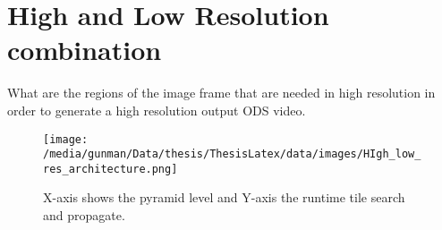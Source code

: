 \section{High and Low Resolution combination}
What are the regions of the image frame that are needed in high resolution in order to generate a high resolution output ODS video. 
\begin{figure*}
	\begin{center}
		\texttt{[image: /media/gunman/Data/thesis/ThesisLatex/data/images/HIgh\_low\_res\_architecture.png]}
		\caption{X-axis shows the pyramid level and Y-axis the runtime tile search and propagate.}
		\label{fig:ex_4_9}
	\end{center}
	\vspace{-0.3in}
\end{figure*} 









